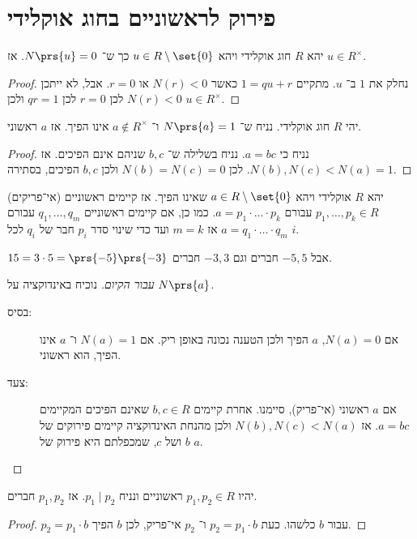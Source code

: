 \documentclass[a4paper,10pt,twoside,openany]{book}
\begin{document}
\section{פירוק לראשוניים בחוג אוקלידי}
\begin{proposition}
יהא
$R$
חוג אוקלידי ויהא
$u \in R \setminus \set{0}$
כך ש־%
$N\prs{u} = 0$.
אז
$u \in R^{\times}$.
\end{proposition}
\begin{proof}
נחלק את
$1$
ב־%
$u$.
מתקיים
$1 = qu + r$
כאשר
$N(r) < 0$
או
$r = 0$.
אבל, לא ייתכן
$N(r) < 0$
לכן
$r=0$
לכן
$qr = 1$
ולכן
$u \in R^{\times}$.
\end{proof}
\begin{proposition}
יהי
$R$
חוג אוקלידי.
נניח ש־%
$N\prs{a} = 1$
ו־%
$a \notin R^{\times}$
אינו הפיך.
אז
$a$
ראשוני.
\end{proposition}
\begin{proof}
נניח כי
$a=bc$.
נניח בשלילה ש־%
$b,c$
שניהם אינם הפיכים. אז
$N(b),N(c) < N(a) = 1$.
לכן
$N(b) = N(c) = 0$
ולכן
$b,c$
הפיכים, בסתירה.
\end{proof}
\begin{theorem}
יהא
$R$
אוקלידי ויהא
$a \in R \setminus \set{0}$
שאינו הפיך.
אז קיימים ראשוניים (אי־פריקים)
$p_1, \ldots, p_k \in R$
עבורם
$a = p_1 \cdot \ldots \cdot p_k$.
כמו כן, אם קיימים ראשוניים
$q_1, \ldots, q_m$
עבורם
$a = q_1\cdot\ldots\cdot q_m$
אז
$m=k$
ועד כדי שינוי סדר
$p_i$
חבר של
$q_i$
לכל
$i$.
\end{theorem}
\begin{example}
$15 = 3\cdot 5 = \prs{-5}\prs{-3}$
אבל
$-5,5$
חברים וגם
$-3,3$
חברים.
\end{example}
\begin{proof}[עבור הקיום]
נוכיח באינדוקציה על
$N\prs{a}$.
\begin{description}
\item[בסיס:]
אם
$N(a) = 0$,
$a$
הפיך ולכן הטענה נכונה באופן ריק.
אם
$N(a) = 1$
ו־%
$a$
אינו הפיך, הוא ראשוני.
\item[צעד:]
אם
$a$
ראשוני (אי־פריק), סיימנו. אחרת קיימים
$b,c \in R$
שאינם הפיכים המקיימים
$a=bc$.
אז
$N(b),N(c) < N(a)$
ולכן מהנחת האינדוקציה קיימים פירוקים של
$b$
ושל
$c$,
שמכפלתם היא פירוק של
$a$.
\end{description}
\end{proof}
\begin{proposition}
יהיו
$p_1,p_2 \in R$
ראשוניים ונניח
$p_1 \mid p_2$.
אז
$p_1,p_2$
חברים.
\end{proposition}
\begin{proof}
$p_2 = p_1 \cdot b$
עבור
$b$
כלשהו. כעת
$p_2 = p_1 \cdot b$
ו־%
$p_2$
אי־פריק, לכן
$b$
הפיך.
\end{proof}
\end{document}
